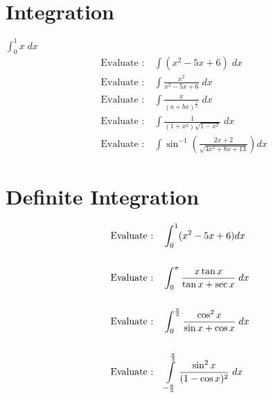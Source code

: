 \documentclass[17pt]{extarticle}
\begin{document}
\section{Integration}
$\int_0^1x\;dx$\\
\begin{align} %
& \text{Evaluate :} \quad \int  (x^2 - 5x + 6)\;dx\\
& \text{Evaluate :}\quad \int  \frac{x^2}{x^2-5x + 6}\;dx  \\
& \text{Evaluate :}\quad \int  \frac{x}{(a+bx)^{\frac{1}{2}}} \;dx  \\
& \text{Evaluate :}\quad \int  \frac{1}{(1+x^2)\sqrt{1-x^2}}\;dx\\
& \text{Evaluate :}\quad \int  \sin^{-1}\left(\frac{2x+2}{\sqrt{4x^2+8x+13}}\right)dx
\end{align}

\section{Definite Integration}

\begin{align*}
& \text{Evaluate :} \quad \int_0^1  (x^2 - 5x + 6) dx\\ \\
& \text{Evaluate :}\quad \int_0^\pi  \frac{x\tan x}{\tan x + \sec x}\;dx  \\ \\
& \text{Evaluate :}\quad \int_0^{\frac{\pi}{2}} \frac{\cos^2x}{\sin x + \cos x} \;dx  \\ \\
& \text{Evaluate :}\quad \int\displaylimits_{-\frac{\pi}{3}}^{\frac{\pi}{3}} \frac{\sin^2x}{(1 -\cos x)^2}\;dx\\
\end{align*}
\end{document}

